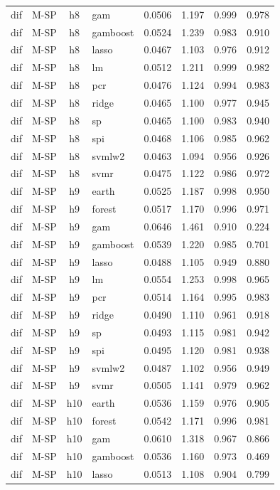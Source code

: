 \begin{ThreePartTable}
\begin{longtable}[t]{llclcccc}
dif & M-SP & h8 & gam & 0.0506 & 1.197 & 0.999 & 0.978\\
dif & M-SP & h8 & gamboost & 0.0524 & 1.239 & 0.983 & 0.910\\
dif & M-SP & h8 & lasso & 0.0467 & 1.103 & 0.976 & 0.912\\
dif & M-SP & h8 & lm & 0.0512 & 1.211 & 0.999 & 0.982\\
dif & M-SP & h8 & pcr & 0.0476 & 1.124 & 0.994 & 0.983\\
dif & M-SP & h8 & ridge & 0.0465 & 1.100 & 0.977 & 0.945\\
dif & M-SP & h8 & sp & 0.0465 & 1.100 & 0.983 & 0.940\\
dif & M-SP & h8 & spi & 0.0468 & 1.106 & 0.985 & 0.962\\
dif & M-SP & h8 & svmlw2 & 0.0463 & 1.094 & 0.956 & 0.926\\
dif & M-SP & h8 & svmr & 0.0475 & 1.122 & 0.986 & 0.972\\
\addlinespace
dif & M-SP & h9 & earth & 0.0525 & 1.187 & 0.998 & 0.950\\
dif & M-SP & h9 & forest & 0.0517 & 1.170 & 0.996 & 0.971\\
dif & M-SP & h9 & gam & 0.0646 & 1.461 & 0.910 & 0.224\\
dif & M-SP & h9 & gamboost & 0.0539 & 1.220 & 0.985 & 0.701\\
dif & M-SP & h9 & lasso & 0.0488 & 1.105 & 0.949 & 0.880\\
dif & M-SP & h9 & lm & 0.0554 & 1.253 & 0.998 & 0.965\\
dif & M-SP & h9 & pcr & 0.0514 & 1.164 & 0.995 & 0.983\\
dif & M-SP & h9 & ridge & 0.0490 & 1.110 & 0.961 & 0.918\\
dif & M-SP & h9 & sp & 0.0493 & 1.115 & 0.981 & 0.942\\
dif & M-SP & h9 & spi & 0.0495 & 1.120 & 0.981 & 0.938\\
dif & M-SP & h9 & svmlw2 & 0.0487 & 1.102 & 0.956 & 0.949\\
dif & M-SP & h9 & svmr & 0.0505 & 1.141 & 0.979 & 0.962\\
\addlinespace
dif & M-SP & h10 & earth & 0.0536 & 1.159 & 0.976 & 0.905\\
dif & M-SP & h10 & forest & 0.0542 & 1.171 & 0.996 & 0.981\\
dif & M-SP & h10 & gam & 0.0610 & 1.318 & 0.967 & 0.866\\
dif & M-SP & h10 & gamboost & 0.0536 & 1.160 & 0.973 & 0.469\\
dif & M-SP & h10 & lasso & 0.0513 & 1.108 & 0.904 & 0.799\\

\end{longtable}
\end{ThreePartTable}
